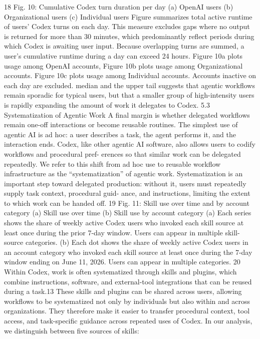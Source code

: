 18
Fig. 10: Cumulative Codex turn duration per day
(a) OpenAI users
(b) Organizational users
(c) Individual users
Figure summarizes total active runtime of users’ Codex turns on each day. This measure excludes gaps where no output is
returned for more than 30 minutes, which predominantly reflect periods during which Codex is awaiting user input. Because
overlapping turns are summed, a user’s cumulative runtime during a day can exceed 24 hours. Figure 10a plots usage among
OpenAI accounts, Figure 10b plots usage among Organizational accounts. Figure 10c plots usage among Individual accounts.
Accounts inactive on each day are excluded.
median and the upper tail suggests that agentic workflows remain sporadic for typical users, but that a
smaller group of high-intensity users is rapidly expanding the amount of work it delegates to Codex.
5.3
Systematization of Agentic Work
A final margin is whether delegated workflows remain one-off interactions or become reusable routines.
The simplest use of agentic AI is ad hoc: a user describes a task, the agent performs it, and the interaction
ends. Codex, like other agentic AI software, also allows users to codify workflows and procedural pref-
erences so that similar work can be delegated repeatedly. We refer to this shift from ad hoc use to reusable
workflow infrastructure as the “systematization” of agentic work. Systematization is an important step
toward delegated production: without it, users must repeatedly supply task context, procedural guid-
ance, and instructions, limiting the extent to which work can be handed off.
19
Fig. 11: Skill use over time and by account category
(a) Skill use over time
(b) Skill use by account category
(a) Each series shows the share of weekly active Codex users who invoked each skill source at least once during
the prior 7-day window. Users can appear in multiple skill-source categories. (b) Each dot shows the share of
weekly active Codex users in an account category who invoked each skill source at least once during the 7-day
window ending on June 11, 2026. Users can appear in multiple categories.
20
Within Codex, work is often systematized through skills and plugins, which combine instructions,
software, and external-tool integrations that can be reused during a task.13 These skills and plugins can
be shared across users, allowing workflows to be systematized not only by individuals but also within
and across organizations. They therefore make it easier to transfer procedural context, tool access, and
task-specific guidance across repeated uses of Codex.
In our analysis, we distinguish between five sources of skills:
